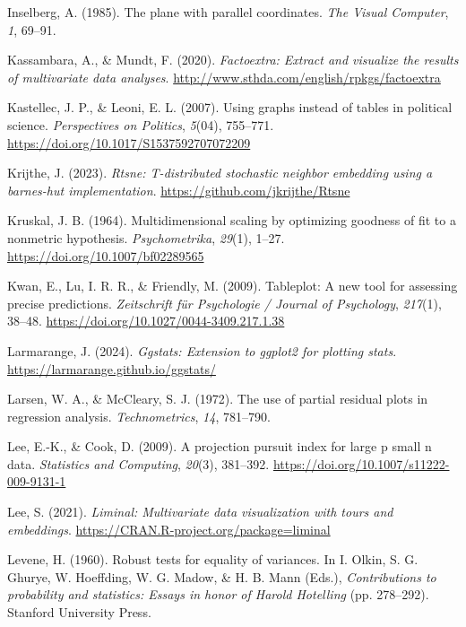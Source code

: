 \documentclass[
  letterpaper,
  10pt,
  krantz2]{krantz}
\newlength{\cslhangindent}
\newenvironment{CSLReferences}[2] %
 {\begin{list}{}{%
  \setlength{\itemindent}{0pt}
  \setlength{\leftmargin}{0pt}
  \setlength{\parsep}{0pt}
  \ifodd #1
   \setlength{\leftmargin}{\cslhangindent}
   \setlength{\itemindent}{-1\cslhangindent}
  \fi
  \setlength{\itemsep}{#2\baselineskip}}}
 {\end{list}}
\begin{document}
\begin{CSLReferences}{1}{0}
Inselberg, A. (1985). The plane with parallel coordinates. \emph{The
Visual Computer}, \emph{1}, 69--91.

Kassambara, A., \& Mundt, F. (2020). \emph{Factoextra: Extract and
visualize the results of multivariate data analyses}.
\url{http://www.sthda.com/english/rpkgs/factoextra}

Kastellec, J. P., \& Leoni, E. L. (2007). Using graphs instead of tables
in political science. \emph{Perspectives on Politics}, \emph{5}(04),
755--771. \url{https://doi.org/10.1017/S1537592707072209}

Krijthe, J. (2023). \emph{Rtsne: T-distributed stochastic neighbor
embedding using a barnes-hut implementation}.
\url{https://github.com/jkrijthe/Rtsne}

Kruskal, J. B. (1964). Multidimensional scaling by optimizing goodness
of fit to a nonmetric hypothesis. \emph{Psychometrika}, \emph{29}(1),
1--27. \url{https://doi.org/10.1007/bf02289565}

Kwan, E., Lu, I. R. R., \& Friendly, M. (2009). Tableplot: A new tool
for assessing precise predictions. \emph{Zeitschrift f{ü}r Psychologie /
Journal of Psychology}, \emph{217}(1), 38--48.
\url{https://doi.org/10.1027/0044-3409.217.1.38}

Larmarange, J. (2024). \emph{Ggstats: Extension to ggplot2 for plotting
stats}. \url{https://larmarange.github.io/ggstats/}

Larsen, W. A., \& McCleary, S. J. (1972). The use of partial residual
plots in regression analysis. \emph{Technometrics}, \emph{14}, 781--790.

Lee, E.-K., \& Cook, D. (2009). A projection pursuit index for large p
small n data. \emph{Statistics and Computing}, \emph{20}(3), 381--392.
\url{https://doi.org/10.1007/s11222-009-9131-1}

Lee, S. (2021). \emph{Liminal: Multivariate data visualization with
tours and embeddings}. \url{https://CRAN.R-project.org/package=liminal}

Levene, H. (1960). Robust tests for equality of variances. In I. Olkin,
S. G. Ghurye, W. Hoeffding, W. G. Madow, \& H. B. Mann (Eds.),
\emph{Contributions to probability and statistics: Essays in honor of
{Harold Hotelling}} (pp. 278--292). Stanford University Press.


\end{CSLReferences}
\end{document}
